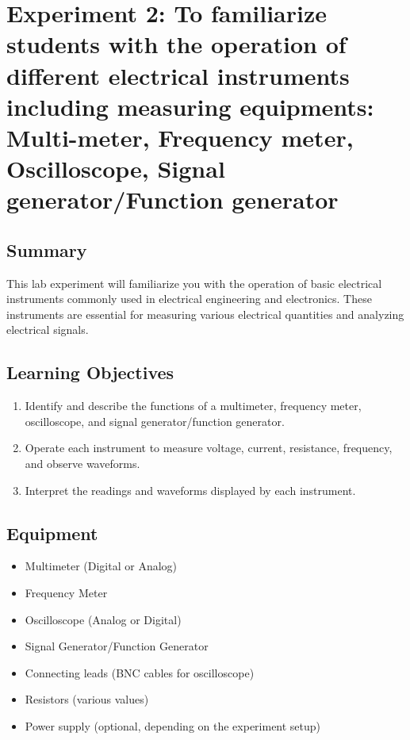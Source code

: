\section*{Experiment 2: To familiarize students with the operation of different electrical instruments including measuring equipments: Multi-meter, Frequency meter, Oscilloscope, Signal generator/Function generator}  


\subsection*{Summary}
This lab experiment will familiarize you with the operation of basic electrical instruments commonly used in electrical engineering and electronics. These instruments are essential for measuring various electrical quantities and analyzing electrical signals.

\subsection*{Learning Objectives}
\begin{enumerate}
    \item Identify and describe the functions of a multimeter, frequency meter, oscilloscope, and signal generator/function generator.
    \item Operate each instrument to measure voltage, current, resistance, frequency, and observe waveforms.
    \item Interpret the readings and waveforms displayed by each instrument.
\end{enumerate}

\subsection*{Equipment}
\begin{itemize}
    \item Multimeter (Digital or Analog)
    \item Frequency Meter
    \item Oscilloscope (Analog or Digital)
    \item Signal Generator/Function Generator
    \item Connecting leads (BNC cables for oscilloscope)
    \item Resistors (various values)
    \item Power supply (optional, depending on the experiment setup)
\end{itemize}


